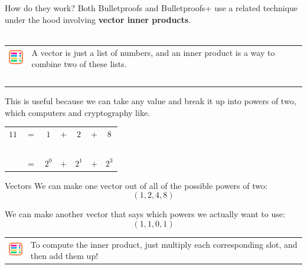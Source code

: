 \documentclass[aspectratio=169]{beamer}
\begin{document}
\begin{frame}{How do they work?}
    Both Bulletproofs and Bulletproofs+ use a related technique under the hood involving \textbf{vector inner products}. \\~\\

    \begin{tabular}{>{\arraybackslash}m{40px} >{\arraybackslash}m{320px}}
        \includegraphics[width=30px]{images/abacus.png} & A vector is just a list of numbers, and an inner product is a way to combine two of these lists. \\~\\
    \end{tabular}

    This is useful because we can take any value and break it up into powers of two, which computers and cryptography like.
    \begin{table}
        \begin{tabular}{ccccccc}
            $11$ & $=$ & $1$ & $+$ & $2$ & $+$ & $8$ \\~\\
            & $=$ & $2^0$ & $+$ & $2^1$ & $+$ & $2^3$
        \end{tabular}
    \end{table}
\end{frame}


\begin{frame}{Vectors}
    We can make one vector out of all of the possible powers of two:
    \begin{displaymath}
        (1, 2, 4, 8)    
    \end{displaymath}

    We can make another vector that says which powers we actually want to use:
    \begin{displaymath}
        (1, 1, 0, 1)
    \end{displaymath}

    \begin{tabular}{>{\arraybackslash}m{40px} >{\arraybackslash}m{320px}}
        \includegraphics[width=30px]{images/abacus.png} & To compute the inner product, just multiply each corresponding slot, and then add them up!
    \end{tabular}
\end{frame}
\end{document}
